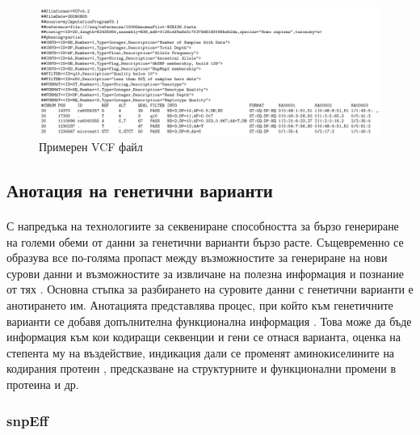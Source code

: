 \documentclass[pdftex,cyrillic,14pt,a4page,twoside,openright]{extreport}
\begin{document}
\begin{figure}[h]
  \centering
  \includegraphics[width=17cm]{figures/vcf}
  \caption {Примерен VCF файл}
  \label{fig:example_vcf}
\end{figure}


\subsection{Анотация на генетични варианти}
\paragraph{}
С напредъка на технологиите за секвениране способността за бързо генериране на големи обеми от данни за генетични варианти бързо расте. Същевременно се образува все по-голяма пропаст между възможностите за генериране на нови сурови данни и възможностите за извличане на полезна информация и познание от тях \cite{yang2015}. Основна стъпка за разбирането на суровите данни с генетични варианти е анотирането им. Анотацията представлява процес, при който към генетичните варианти се добавя допълнителна функционална информация \cite{mccarthy2014}. Това може да бъде информация към кои кодиращи секвенции и гени се отнася варианта, оценка на степента му на въздействие, индикация дали се променят аминокиселините на кодирания протеин \cite{cingolani2012}, предсказване на структурните и функционални промени в протеина \cite{mccarthy2014} и др.
\subsubsection{snpEff}
\end{document}
